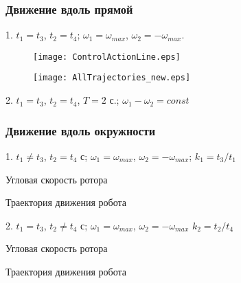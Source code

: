 \begin{frame}
\frametitle{Движение вдоль прямой}

1. $t_1=t_3$, $ t_2 = t_4$; \quad $ \omega_1 = \omega_{max} $, $ \omega_2 = -\omega_{max} $.

\begin{minipage}[t]{0.3\linewidth}
	\begin{figure}[!ht]
		\centering
		\texttt{[image: ControlActionLine.eps]}
	\end{figure}	
\end{minipage}
\hfill
\begin{minipage}[t]{0.68\linewidth}
	\begin{figure}[!ht]
		\centering
		\texttt{[image: AllTrajectories\_new.eps]}
	\end{figure}
\end{minipage}	
	
2. 	$t_1=t_3$, $ t_2 = t_4$, $ T=2 $ с.; \quad $ \omega_1 - \omega_2 = const$

\begin{minipage}[h]{0.47\linewidth}
\end{minipage}
\hfill
\begin{minipage}[h]{0.47\linewidth}
\end{minipage}


\end{frame}



\begin{frame}
\frametitle{Движение вдоль окружности}

1. $t_1 \neq t_3$, $t_2 = t_4$ с; \quad	$ \omega_1 = \omega_{max} $, $ \omega_2 = -\omega_{max} $; \quad $ k_1 = t_3 / t_1 $
		
	
	\begin{minipage}[t]{0.47\linewidth}
	{Угловая скорость ротора}
	\end{minipage}
	\hfill
	\begin{minipage}[t]{0.47\linewidth}
		{Траектория движения робота}
	\end{minipage}

\vspace{4mm}

2. $t_1 = t_3$, $t_2 \neq t_4$ с; \quad $ \omega_1 = \omega_{max} $, $ \omega_2 = -\omega_{max} $ \quad $ k_2 = t_2 / t_4 $

\begin{minipage}[t]{0.47\linewidth}
	{Угловая скорость ротора}
\end{minipage}
\hfill
\begin{minipage}[t]{0.47\linewidth}
	{Траектория движения робота}
\end{minipage}

\end{frame}


